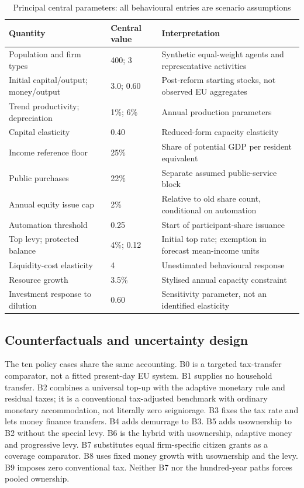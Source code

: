 \begin{table}[htbp]\centering\small
\caption{Principal central parameters: all behavioural entries are scenario assumptions}
\begin{tabularx}{\linewidth}{@{}p{.34\linewidth}p{.18\linewidth}X@{}}
\toprule
Quantity & Central value & Interpretation\\
\midrule
Population and firm types & 400; 3 & Synthetic equal-weight agents and representative activities\\
Initial capital/output; money/output & 3.0; 0.60 & Post-reform starting stocks, not observed EU aggregates\\
Trend productivity; depreciation & 1\%; 6\% & Annual production parameters\\
Capital elasticity & 0.40 & Reduced-form capacity elasticity\\
Income reference floor & 25\% & Share of potential GDP per resident equivalent\\
Public purchases & 22\% & Separate assumed public-service block\\
Annual equity issue cap & 2\% & Relative to old share count, conditional on automation\\
Automation threshold & 0.25 & Start of participant-share issuance\\
Top levy; protected balance & 4\%; 0.12 & Initial top rate; exemption in forecast mean-income units\\
Liquidity-cost elasticity & 4 & Unestimated behavioural response\\
Resource growth & 3.5\% & Stylised annual capacity constraint\\
Investment response to dilution & 0.60 & Sensitivity parameter, not an identified elasticity\\
\bottomrule
\end{tabularx}
\end{table}

\subsection{Counterfactuals and uncertainty design}
The ten policy cases share the same accounting. B0 is a targeted tax-transfer comparator, not a fitted present-day EU system. B1 supplies no household transfer. B2 combines a universal top-up with the adaptive monetary rule and residual taxes; it is a conventional tax-adjusted benchmark with ordinary monetary accommodation, not literally zero seigniorage. B3 fixes the tax rate and lets money finance transfers. B4 adds demurrage to B3. B5 adds usownership to B2 without the special levy. B6 is the hybrid with usownership, adaptive money and progressive levy. B7 substitutes equal firm-specific citizen grants as a coverage comparator. B8 uses fixed money growth with usownership and the levy. B9 imposes zero conventional tax. Neither B7 nor the hundred-year paths forces pooled ownership.

